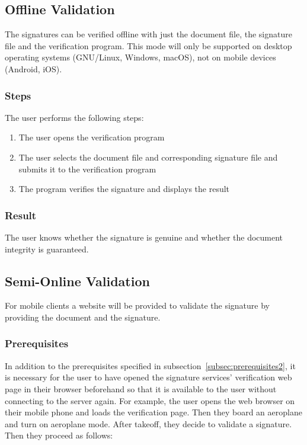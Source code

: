 \subsection{Offline Validation}\label{subsec:offline-validation2}
The signatures can be verified offline with just the document file, the signature file and the verification program.
This mode will only be supported on desktop operating systems (GNU/Linux, Windows, macOS), not on mobile devices (Android, iOS).

\subsubsection{Steps}
The user performs the following steps:
\begin{enumerate}
    \item The user opens the verification program
    \item The user selects the document file and corresponding signature file and submits it to the verification program
    \item The program verifies the signature and displays the result
\end{enumerate}
\subsubsection{Result}
The user knows whether the signature is genuine and whether the document integrity is guaranteed.

\subsection{Semi-Online Validation}\label{subsec:semi-online-validation}
For mobile clients a website will be provided to validate the signature by providing the document and the signature.

\subsubsection{Prerequisites}
In addition to the prerequisites specified in subsection~\ref{subsec:prerequisites2},
it is necessary for the user to have opened the signature services' verification web page in their browser beforehand
so that it is available to the user without connecting to the server again.
For example, the user opens the web browser on their mobile phone and loads the verification page.
Then they board an aeroplane and turn on aeroplane mode.
After takeoff, they decide to validate a signature.
Then they proceed as follows:

